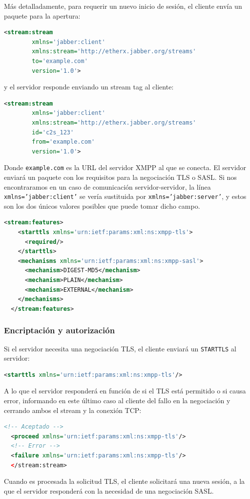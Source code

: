 \documentclass[a4paper, 11pt]{article} %
\begin{document}
	Más detalladamente, para requerir un nuevo inicio de sesión, el cliente envía un paquete para la apertura:
	\begin{lstlisting}[language=XML] 
  <stream:stream 
	    xmlns='jabber:client'
	    xmlns:stream='http://etherx.jabber.org/streams'
	    to='example.com' 
	    version='1.0'>
	\end{lstlisting}
	y el servidor responde enviando un stream tag al cliente:
	\begin{lstlisting}[language=XML] 
  <stream:stream
	    xmlns='jabber:client'
	    xmlns:stream='http://etherx.jabber.org/streams'
	    id='c2s_123'
	    from='example.com'
	    version='1.0'>
	\end{lstlisting}    
	Donde \texttt{example.com} es la URL del servidor XMPP al que se conecta. El servidor
	enviará un paquete con los requisitos para la negociación TLS o SASL. Si nos encontraramos en un caso de 
	comunicación servidor-servidor, la línea \texttt{xmlns='jabber:client'} se vería sustituida por 
	\texttt{xmlns='jabber:server'}, y estos son los dos únicos valores posibles que puede tomar dicho campo.
	\begin{lstlisting}[language=XML]
  <stream:features> 
    <starttls xmlns='urn:ietf:params:xml:ns:xmpp-tls'>    
      <required/>  
    </starttls>  
    <mechanisms xmlns='urn:ietf:params:xml:ns:xmpp-sasl'>    
      <mechanism>DIGEST-MD5</mechanism>    
      <mechanism>PLAIN</mechanism>   
      <mechanism>EXTERNAL</mechanism>  
    </mechanisms> 
  </stream:features>
	\end{lstlisting}

      \subsubsection{Encriptación y autorización}
	Si el servidor necesita una negociación TLS, el cliente enviará un \texttt{STARTTLS} al servidor:
	\begin{lstlisting}[language=XML]
  <starttls xmlns='urn:ietf:params:xml:ns:xmpp-tls'/>
	\end{lstlisting}
	A lo que el servidor responderá en función de si el TLS está permitido o si causa error, informando en
	este último caso al cliente del fallo en la negociación y cerrando ambos el stream y la conexión TCP:
	\begin{lstlisting}[language=XML]
  <!-- Aceptado -->
  <proceed xmlns='urn:ietf:params:xml:ns:xmpp-tls'/>
  <!-- Error -->
  <failure xmlns='urn:ietf:params:xml:ns:xmpp-tls'/> 
  </stream:stream>
	\end{lstlisting}
	Cuando es procesada la solicitud TLS, el cliente solicitará una nueva sesión, a la que el servidor
	responderá con la necesidad de una negociación SASL.
\end{document}
